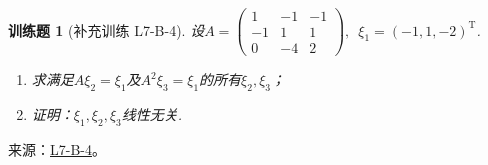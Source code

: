 \documentclass[12pt,fontset=fandol]{ctexart}
\newtheorem{exercise}{训练题}[section]
\begin{document}
\begin{exercise}[补充训练 L7-B-4]\label{prob:L7-B-4}
设$A=\begin{pmatrix}
                1 & -1 & -1 \\ -1 & 1 & 1 \\ 0 & -4 & 2
            \end{pmatrix},\enspace\xi_1=(-1,1,-2)^\mathrm{T}$.
        \begin{enumerate}
            \item 求满足$A\xi_2=\xi_1$及$A^2\xi_3=\xi_1$的所有$\xi_2,\xi_3$；

            \item 证明：$\xi_1,\xi_2,\xi_3$线性无关.
        \end{enumerate}
\end{exercise}
\noindent 来源：\href{https://github.com/yhwu-is/Linear-Algebra-Left-Undone/blob/new/%E8%AE%B2%E4%B9%89/%E4%B8%93%E9%A2%98/7%20%E7%BA%BF%E6%80%A7%E6%98%A0%E5%B0%84%E7%9F%A9%E9%98%B5%E8%A1%A8%E7%A4%BA%E4%B8%8E%E7%9F%A9%E9%98%B5%E8%BF%90%E7%AE%97%E5%9F%BA%E7%A1%80.tex}{L7-B-4}。
\end{document}
